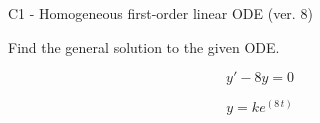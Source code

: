 \begin{exercise}
  \begin{exerciseTitle}C1 - Homogeneous first-order linear ODE (ver. 8)\end{exerciseTitle}
  \begin{exerciseStatement}
    
Find the general solution to the given ODE.

    
\[y'-8y=0\]

  \end{exerciseStatement}
  \begin{exerciseAnswer}
    
\[y= k e^{\left(8 \, t\right)}\]

  \end{exerciseAnswer}
\end{exercise}
